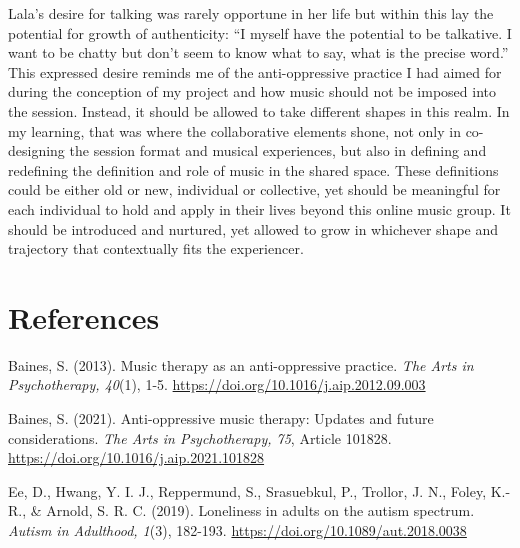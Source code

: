 \documentclass[authordate, empirical, issue]{jote-new-article}
\begin{document}
Lala's desire for talking was rarely opportune in her life but within this lay the potential for growth of authenticity: “I myself have the potential to be talkative. I want to be chatty but don't seem to know what to say, what is the precise word.” This expressed desire reminds me of the anti-oppressive practice I had aimed for during the conception of my project and how music should not be imposed into the session. Instead, it should be allowed to take different shapes in this realm. In my learning, that was where the collaborative elements shone, not only in co-designing the session format and musical experiences, but also in defining and redefining the definition and role of music in the shared space. These definitions could be either old or new, individual or collective, yet should be meaningful for each individual to hold and apply in their lives beyond this online music group. It should be introduced and nurtured, yet allowed to grow in whichever shape and trajectory that contextually fits the experiencer.











\newpage
\section{References}



\hspace*{\parindent}Baines, S. (2013). Music therapy as an anti-oppressive practice. \emph{The Arts in Psychotherapy, 40}(1), 1-5. \href{https://doi.org/10.1016/j.aip.2012.09.003}{https://doi.org/10.1016/j.aip.2012.09.003}







Baines, S. (2021). Anti-oppressive music therapy: Updates and future considerations. \emph{The Arts in Psychotherapy, 75}, Article 101828. \href{https://doi.org/10.1016/j.aip.2021.101828}{https://doi.org/10.1016/j.aip.2021.101828}







Ee, D., Hwang, Y. I. J., Reppermund, S., Srasuebkul, P., Trollor, J. N., Foley, K.-R., \& Arnold, S. R. C. (2019). Loneliness in adults on the autism spectrum. \emph{Autism in Adulthood, 1}(3), 182-193. \href{https://doi.org/10.1089/aut.2018.0038}{https://doi.org/10.1089/aut.2018.0038}
\end{document}
